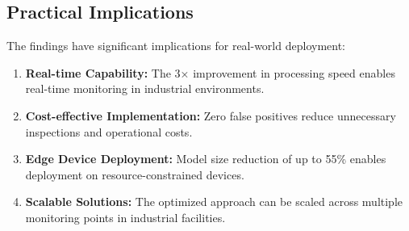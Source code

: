 \subsection{Practical Implications}

The findings have significant implications for real-world deployment:

\begin{enumerate}
\item \textbf{Real-time Capability:} The 3× improvement in processing speed enables real-time monitoring in industrial environments.

\item \textbf{Cost-effective Implementation:} Zero false positives reduce unnecessary inspections and operational costs.

\item \textbf{Edge Device Deployment:} Model size reduction of up to 55\% enables deployment on resource-constrained devices.

\item \textbf{Scalable Solutions:} The optimized approach can be scaled across multiple monitoring points in industrial facilities.
\end{enumerate}